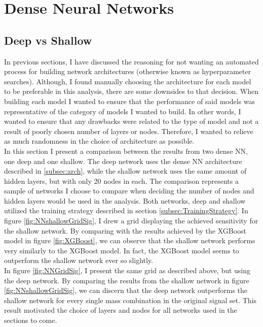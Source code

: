\section{Dense Neural Networks}
\subsection{Deep vs Shallow}
In previous sections, I have discussed the reasoning for not wanting an automated process for building network architectures (otherwise known
as hyperparameter searches). Although, I found manually choosing the architecture for each model to be preferable in this analysis, there 
are some downsides to that decision. When building each model I wanted to ensure that the performance of said models was representative of 
the category of models I wanted to build. In other words, I wanted to ensure that any drawbacks were related to the type of model and not 
a result of poorly chosen number of layers or nodes. Therefore, I wanted to relieve as much randomness in the choice of architecture as possible.
\\
In this section I present a comparison between the results from two dense \ac{NN}, one deep and one shallow. The deep network 
uses the dense \ac{NN} architecture described in \ref{subsec:arch}, while the shallow network uses the same amount of hidden layers,
but with only 20 nodes in each. The comparison represents a sample of networks I choose to compare when deciding the number of nodes and 
hidden layers would be used in the analysis. Both networks, deep and shallow utilized the training strategy described in section 
\ref{subsec:TrainingStrategy}. In figure \ref{fig:NNshallowGridSig}, I drew a grid displaying the achieved sensitivity for the shallow 
network. By comparing with the results achieved by the XGBoost model in figure \ref{fig:XGBoost}, we can observe that the shallow network 
performs very similarly to the XGBoost model. In fact, the XGBoost model seems to outperform the shallow network ever so slightly.
\\
In figure \ref{fig:NNGridSig}, I present the same grid as described above, but using the deep network. By comparing the results from the shallow 
network in figure \ref{fig:NNshallowGridSig}, we can discern that the deep network outperforms the shallow network for every single mass 
combination in the original signal set. This result motivated the choice of layers and nodes for all networks used in the sections to come.
